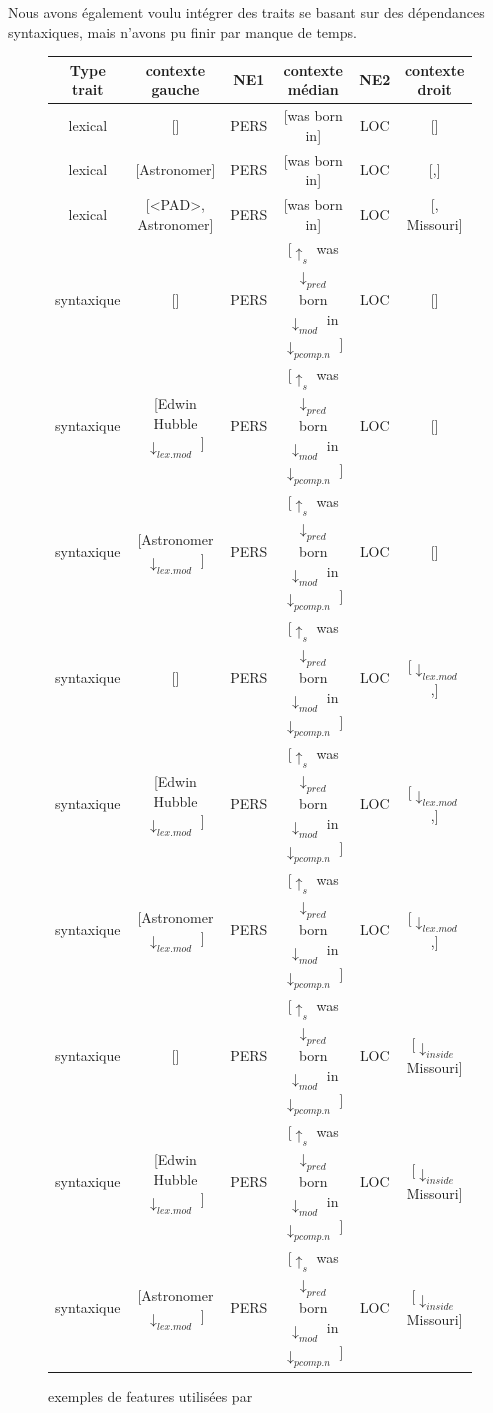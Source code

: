 \documentclass[12pt,a4paper,times,twoside,openright]{report}
\begin{document}
Nous avons également voulu intégrer des traits se basant sur des dépendances syntaxiques, mais n'avons pu finir par manque de temps.

\begin{figure}[ht!]
\centering
\scriptsize
\begin{tabular}{|c|c|c|c|c|c|}
\hline
Type trait & contexte gauche & NE1 & contexte médian &  NE2 & contexte droit \\
\hline
lexical & [] & PERS & [was born in] & LOC & [] \\
lexical & [Astronomer] & PERS & [was born in] & LOC & [,] \\
lexical & [<PAD>, Astronomer] & PERS & [was born in] & LOC & [, Missouri] \\
syntaxique & [] & PERS & [$\uparrow_{s}$ was $\downarrow_{pred}$ born $\downarrow_{mod}$ in $\downarrow_{pcomp.n}$ ] & LOC & [] \\
syntaxique & [Edwin Hubble $\downarrow_{lex.mod}$ ] & PERS & [$\uparrow_{s}$ was $\downarrow_{pred}$ born $\downarrow_{mod}$ in $\downarrow_{pcomp.n}$ ] & LOC & [] \\
syntaxique & [Astronomer $\downarrow_{lex.mod}$ ] & PERS & [$\uparrow_{s}$ was $\downarrow_{pred}$ born $\downarrow_{mod}$ in $\downarrow_{pcomp.n}$ ] & LOC & [] \\
syntaxique & [] & PERS & [$\uparrow_{s}$ was $\downarrow_{pred}$ born $\downarrow_{mod}$ in $\downarrow_{pcomp.n}$ ] & LOC & [$\downarrow_{lex.mod}$ ,] \\
syntaxique & [Edwin Hubble $\downarrow_{lex.mod}$ ] & PERS & [$\uparrow_{s}$ was $\downarrow_{pred}$ born $\downarrow_{mod}$ in $\downarrow_{pcomp.n}$ ] & LOC & [$\downarrow_{lex.mod}$ ,] \\
syntaxique & [Astronomer $\downarrow_{lex.mod}$ ] & PERS & [$\uparrow_{s}$ was $\downarrow_{pred}$ born $\downarrow_{mod}$ in $\downarrow_{pcomp.n}$ ] & LOC & [$\downarrow_{lex.mod}$ ,] \\
syntaxique & [] & PERS & [$\uparrow_{s}$ was $\downarrow_{pred}$ born $\downarrow_{mod}$ in $\downarrow_{pcomp.n}$ ] & LOC & [$\downarrow_{inside}$ Missouri] \\
syntaxique & [Edwin Hubble $\downarrow_{lex.mod}$ ] & PERS & [$\uparrow_{s}$ was $\downarrow_{pred}$ born $\downarrow_{mod}$ in $\downarrow_{pcomp.n}$ ] & LOC & [$\downarrow_{inside}$ Missouri] \\
syntaxique & [Astronomer $\downarrow_{lex.mod}$ ] & PERS & [$\uparrow_{s}$ was $\downarrow_{pred}$ born $\downarrow_{mod}$ in $\downarrow_{pcomp.n}$ ] & LOC & [$\downarrow_{inside}$ Missouri] \\
\hline
\end{tabular}
\caption{exemples de features utilisées par \citet{mintz2009distant}}
\label{tab:Mintz-features}
\end{figure}
\end{document}

